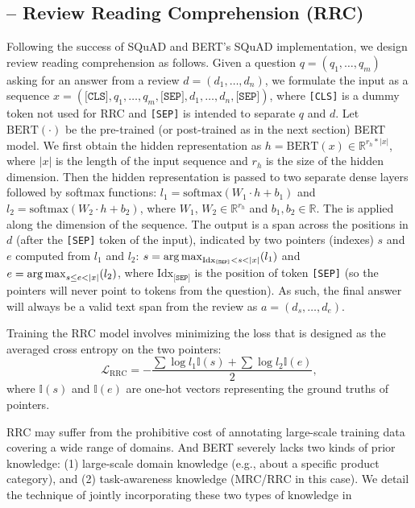 \subsection{-- Review Reading Comprehension (RRC)}
\label{chap6:sec:rrc}
Following the success of SQuAD \cite{rajpurkar2016squad} and BERT's SQuAD implementation, we design review reading comprehension as follows.
Given a question $q=(q_1, \dots, q_m)$ asking for an answer from a review $d=(d_1, \dots, d_n)$, we formulate the input as a sequence $x=(\texttt{[CLS]}, q_1, \dots, q_m, \texttt{[SEP]}, d_1, \dots, d_n, \texttt{[SEP]})$, where \texttt{[CLS]} is a dummy token not used for RRC and \texttt{[SEP]} is intended to separate $q$ and $d$.
Let $\text{BERT}(\cdot)$ be the pre-trained (or post-trained as in the next section) BERT model. We first obtain the hidden representation as $h=\text{BERT}(x) \in \mathbb{R}^{r_h*|x|}$, where $|x|$ is the length of the input sequence and $r_h$ is the size of the hidden dimension. Then the hidden representation is passed to two separate dense layers followed by softmax functions: $l_1=\text{softmax}(W_1 \cdot h + b_1)$ and $l_2=\text{softmax}(W_2 \cdot h + b_2)$, where $W_1$, $W_2 \in \mathbb{R}^{r_h}$ and $b_1, b_2 \in \mathbb{R}$. The  is applied along the dimension of the sequence.
The output is a span across the positions in $d$ (after the \texttt{[SEP]} token of the input), indicated by two pointers (indexes) $s$ and $e$ computed from $l_1$ and $l_2$: $s=\argmax_{ \text{Idx}_{\texttt{[SEP]}} < s<|x|}(l_1)$ and $e=\argmax_{s\le e<|x|}(l_2)$, where $\text{Idx}_{\texttt{[SEP]}}$ is the position of token \texttt{[SEP]} (so the pointers will never point to tokens from the question).
As such, the final answer will always be a valid text span from the review as $a=(d_s, \dots, d_e)$.

Training the RRC model involves minimizing the loss that is designed as the averaged cross entropy on the two pointers: $$\mathcal{L}_{\text{RRC}}=-\frac{\sum \log l_1 \mathbb{I}(s)+ \sum \log l_2 \mathbb{I}(e)}{2},$$ where $\mathbb{I}(s)$ and $\mathbb{I}(e)$ are one-hot vectors representing the ground truths of pointers.

RRC may suffer from the prohibitive cost of annotating large-scale training data covering a wide range of domains. 
And BERT severely lacks two kinds of prior knowledge: (1) large-scale domain knowledge (e.g., about a specific product category), and (2) task-awareness knowledge (MRC/RRC in this case).
We detail the technique of jointly incorporating these two types of knowledge in %

